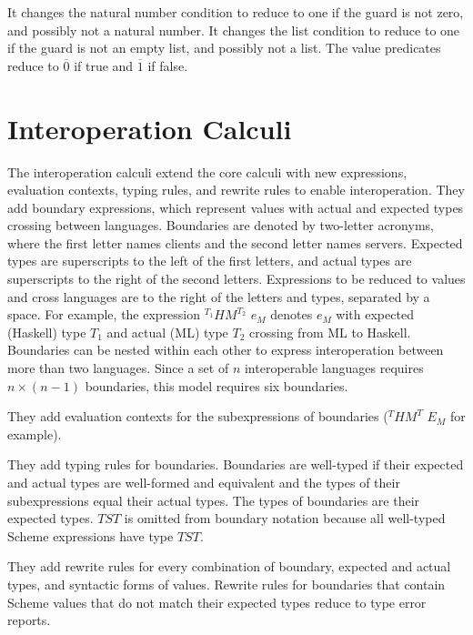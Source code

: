 It changes the natural number condition to reduce to one if the guard is not zero, and possibly not a natural number.  It changes the list condition to reduce to one if the guard is not an empty list, and possibly not a list.  The value predicates reduce to $\overline{0}$ if true and $\overline{1}$ if false.











\clearpage

\section{Interoperation Calculi}

The interoperation calculi extend the core calculi with new expressions, evaluation contexts, typing rules, and rewrite rules to enable interoperation.  They add boundary expressions, which represent values with actual and expected types crossing between languages.  Boundaries are denoted by two-letter acronyms, where the first letter names clients and the second letter names servers.  Expected types are superscripts to the left of the first letters, and actual types are superscripts to the right of the second letters.  Expressions to be reduced to values and cross languages are to the right of the letters and types, separated by a space.  For example, the expression $^{T_{1}}HM^{T_{2}}$ $e_{M}$ denotes $e_{M}$ with expected (Haskell) type $T_{1}$ and actual (ML) type $T_{2}$ crossing from ML to Haskell.  Boundaries can be nested within each other to express interoperation between more than two languages.  Since a set of $n$ interoperable languages requires $n\times(n-1)$ boundaries, this model requires six boundaries.

They add evaluation contexts for the subexpressions of boundaries ($^{T}HM^{T}$ $E_{M}$ for example).

They add typing rules for boundaries.  Boundaries are well-typed if their expected and actual types are well-formed and equivalent and the types of their subexpressions equal their actual types.  The types of boundaries are their expected types.  $TST$ is omitted from boundary notation because all well-typed Scheme expressions have type $TST$.

They add rewrite rules for every combination of boundary, expected and actual types, and syntactic forms of values.  Rewrite rules for boundaries that contain Scheme values that do not match their expected types reduce to type error reports.

